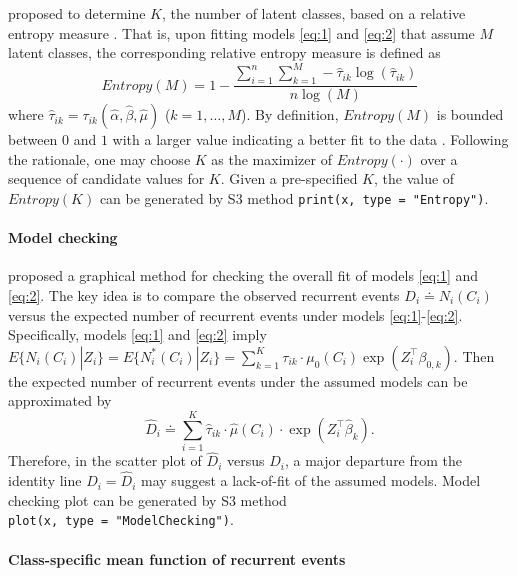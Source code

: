\citet{zhao2022semiparametric} proposed to determine \(K\), the number of latent classes, based on a relative entropy measure
\citep{ramaswamy1993empirical}. That is, upon fitting models \eqref{eq:1} and \eqref{eq:2} that assume \(M\) latent classes, the corresponding relative entropy measure is defined as
\begin{equation} 
\label{eq:15}
Entropy(M) = 1 - \frac{\sum _{i = 1} ^{n} \sum _{k = 1} ^{M} - \hat{\tau} _{ik} \log(\hat{\tau} _{ik})}{n \log(M)} 
\end{equation}
where
\(\hat{\tau} _{ik} = \tau _{ik} (\hat{\alpha}, \hat{\beta}, \hat{\mu})\) (\(k=1,\ldots, M\)).
By definition, \(Entropy(M)\) is bounded between \(0\) and \(1\) with a larger value
indicating a better fit to the data \citep{Celeux1996}. Following the rationale, one may choose \(K\) as the maximizer of \(Entropy(\cdot)\) over a sequence of candidate values for \(K\).
Given a pre-specified \(K\), the value of \(Entropy(K)\) can be generated by S3 method \texttt{print(x,\ type\ =\ "Entropy")}.

\hypertarget{model-checking}{%
\paragraph{Model checking}\label{model-checking}}

\citet{zhao2022semiparametric} proposed a graphical method for checking the overall fit of models \eqref{eq:1} and \eqref{eq:2}. The key idea is to compare the
observed recurrent events \(D_i \doteq N_i(C_i)\) versus the expected number of recurrent events under models \eqref{eq:1}-\eqref{eq:2}. Specifically, models \eqref{eq:1} and \eqref{eq:2} imply
\(E \{ N_{i} (C_i) | Z_i \} = E \{ N_{i} ^{*} (C_i) | Z_i \} = \sum _{k = 1} ^{K} \tau _{ik} \cdot \mu _{0} (C_i) \exp (Z_{i} ^{\top} \beta _{0, k}).\)
Then the expected number of recurrent events under the assumed models can be approximated by
\begin{equation} 
\label{eq:16}
\hat{D}_i \doteq \sum_{i = 1} ^{K} \hat{\tau} _{ik} \cdot \hat{\mu}(C_i) \cdot \exp(Z_{i} ^{\top} \hat{\beta}_k ).
\end{equation}
Therefore, in the scatter plot of \(\hat D_i\) versus \({D} _i\), a major departure
from the identity line \(D_i = \hat{D} _i\) may suggest a lack-of-fit of the assumed models.
Model checking plot can be generated by S3 method \texttt{plot(x,\ type\ =\ "ModelChecking")}.

\hypertarget{class-specific-mean-function-of-recurrent-events}{%
\paragraph{Class-specific mean function of recurrent events}\label{class-specific-mean-function-of-recurrent-events}}

